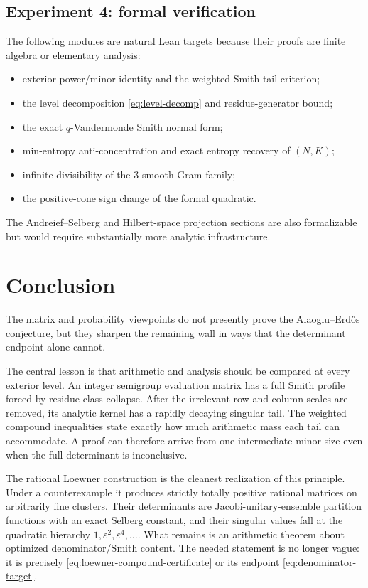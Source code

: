 \documentclass[11pt,oneside]{article}
\theoremstyle{definition}
\theoremstyle{remark}
\newcommand{\AEconj}{Alaoglu--Erd\H{o}s}
\newcommand{\eps}{\varepsilon}
\begin{document}
\subsection{Experiment 4: formal verification}

The following modules are natural Lean targets because their proofs are finite algebra or elementary analysis:
\begin{itemize}
\item exterior-power/minor identity and the weighted Smith-tail criterion;
\item the level decomposition \eqref{eq:level-decomp} and residue-generator bound;
\item the exact $q$-Vandermonde Smith normal form;
\item min-entropy anti-concentration and exact entropy recovery of $(N,K)$;
\item infinite divisibility of the $3$-smooth Gram family;
\item the positive-cone sign change of the formal quadratic.
\end{itemize}
The Andreief--Selberg and Hilbert-space projection sections are also formalizable but would require substantially more analytic infrastructure.

\section{Conclusion}
\label{sec:conclusion}

The matrix and probability viewpoints do not presently prove the \AEconj{} conjecture, but they sharpen the remaining wall in ways that the determinant endpoint alone cannot.

The central lesson is that arithmetic and analysis should be compared at every exterior level.  An integer semigroup evaluation matrix has a full Smith profile forced by residue-class collapse.  After the irrelevant row and column scales are removed, its analytic kernel has a rapidly decaying singular tail.  The weighted compound inequalities state exactly how much arithmetic mass each tail can accommodate.  A proof can therefore arrive from one intermediate minor size even when the full determinant is inconclusive.

The rational Loewner construction is the cleanest realization of this principle.  Under a counterexample it produces strictly totally positive rational matrices on arbitrarily fine clusters.  Their determinants are Jacobi-unitary-ensemble partition functions with an exact Selberg constant, and their singular values fall at the quadratic hierarchy $1,\eps^2,\eps^4,\dots$.  What remains is an arithmetic theorem about optimized denominator/Smith content.  The needed statement is no longer vague: it is precisely \eqref{eq:loewner-compound-certificate} or its endpoint \eqref{eq:denominator-target}.
\end{document}
